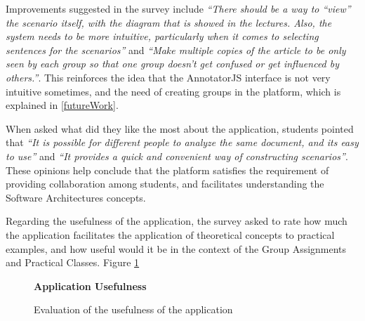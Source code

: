 \documentclass[conference]{IEEEtran}
\begin{document}
Improvements suggested in the survey include \textit{``There should be a way to ``view'' the scenario itself, with the diagram that is showed in the lectures. Also, the system needs to be more intuitive, particularly when it comes to selecting sentences for the scenarios''} and \textit{``Make multiple copies of the article to be only seen by each group so that one group doesn't get confused or get influenced by others.''}. This reinforces the idea that the AnnotatorJS interface is not very intuitive sometimes, and the need of creating groups in the platform, which is explained in \ref{futureWork}.

When asked what did they like the most about the application, students pointed that \textit{``It is possible for different people to analyze the same document, and its easy to use''} and \textit{``It provides a quick and convenient way of constructing scenarios''}. These opinions help conclude that the platform satisfies the requirement of providing collaboration among students, and facilitates understanding the Software Architectures concepts.

Regarding the usefulness of the application, the survey asked to rate how much the application facilitates the application of theoretical concepts to practical examples, and how useful would it be in the context of the Group Assignments and Practical Classes. Figure \ref{figure:usefulnessEvaluation}

\begin{figure}[h]
\centering
\begin{normalsize}
\textbf{Application Usefulness}\\
\end{normalsize}
\scriptsize
{}
\caption{Evaluation of the usefulness of the application}
\label{figure:usefulnessEvaluation}
\end{figure}
\end{document}
